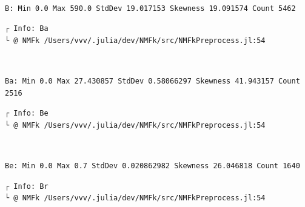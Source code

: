 \documentclass[11pt]{article}
\begin{document}
    \begin{center}
    \end{center}
    { \hspace*{\fill} \\}
    
    \begin{Verbatim}[commandchars=\\\{\}]
B: Min 0.0 Max 590.0 StdDev 19.017153 Skewness 19.091574 Count 5462
    \end{Verbatim}

    \begin{Verbatim}[commandchars=\\\{\}]
┌ Info: Ba
└ @ NMFk /Users/vvv/.julia/dev/NMFk/src/NMFkPreprocess.jl:54
    \end{Verbatim}

    \begin{center}
    \end{center}
    { \hspace*{\fill} \\}
    
    \begin{Verbatim}[commandchars=\\\{\}]
Ba: Min 0.0 Max 27.430857 StdDev 0.58066297 Skewness 41.943157 Count 2516
    \end{Verbatim}

    \begin{Verbatim}[commandchars=\\\{\}]
┌ Info: Be
└ @ NMFk /Users/vvv/.julia/dev/NMFk/src/NMFkPreprocess.jl:54
    \end{Verbatim}

    \begin{center}
    \end{center}
    { \hspace*{\fill} \\}
    
    \begin{Verbatim}[commandchars=\\\{\}]
Be: Min 0.0 Max 0.7 StdDev 0.020862982 Skewness 26.046818 Count 1640
    \end{Verbatim}

    \begin{Verbatim}[commandchars=\\\{\}]
┌ Info: Br
└ @ NMFk /Users/vvv/.julia/dev/NMFk/src/NMFkPreprocess.jl:54
    \end{Verbatim}
\end{document}
